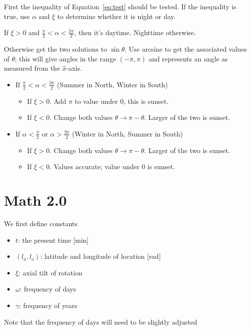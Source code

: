 \documentclass[12pt,a4paper]{article}
\begin{document}
First the inequality of Equation~\eqref{eq:test} should be tested. If the inequality is true, use \(\alpha\) and \(\xi\) to determine whether it is night or day. 
\begin{center}
If \(\xi>0\) and \(\tfrac{\pi}{2} < \alpha < \tfrac{3\pi}{2}\), then it's daytime. Nighttime otherwise. 
\end{center}
Otherwise get the two solutions to \(\sin\theta\). Use arcsine to get the associated values of \(\theta\); this will give angles in the range \(\left(-\pi,\pi\right)\) and represents an angle as measured from the \(\hat{x}\)-axis. 
\begin{itemize}
	\item If \(\tfrac{\pi}{2}<\alpha<\tfrac{3\pi}{2}\) (Summer in North, Winter in South)
	\begin{itemize}
		\item If \(\xi > 0\). Add \(\pi\) to value under 0, this is sunset. 
		\item If \(\xi < 0\). Change both values \(\theta\to\pi-\theta\). Larger of the two is sunset. 
	\end{itemize}
	\item If \(\alpha < \tfrac{\pi}{2}\) or \(\alpha>\tfrac{3\pi}{2}\) (Winter in North, Summer in South)
	\begin{itemize}
		\item If \(\xi > 0\). Change both values \(\theta\to\pi-\theta\). Larger of the two is sunset. 
		\item If \(\xi < 0\). Values accurate; value under 0 is sunset. 
	\end{itemize}
	
\end{itemize}

\section{Math 2.0}
We first define constants
\begin{itemize}
	\item \(t\): the present time [min]
	\item \((l_{a},l_{o})\): latitude and longitude of location [rad]
	\item \(\xi\): axial tilt of rotation 
	\item \(\omega\): frequency of days
	\item \(\gamma\): frequency of years
\end{itemize}
Note that the frequency of days will need to be slightly adjusted 
\end{document}
